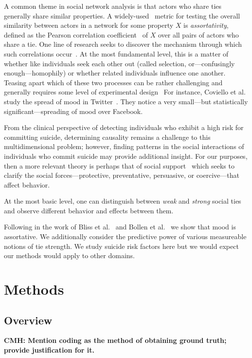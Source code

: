 \documentclass[11pt]{article}
\begin{document}
A common theme in social network analysis is that actors who share ties generally share similar properties. A widely-used~\cite{bliss2012twitter,coviello2014,bollen2011happiness} metric for testing the overall similarity between 
actors in a network for some property $X$ is \emph{assortativity}, defined as  the Pearson correlation coefficient~\cite{newman2002assortative} of $X$ over all pairs of actors who share a tie.  One line of research seeks
to discover the mechanism through which such correlations occur~\cite{newman2002assortative}. 
At the most fundamental level, this is a matter of whether like individuals seek each other out (called selection, or---confusingly enough---homophily) or whether related individuals influence one another. Teasing apart which of these two processes can be rather challenging and generally requires some level of experimental design~\cite{centola2010spread,centola2011experimental}
For instance, Coviello et al. study the spread of mood in Twitter~\cite{coviello2014}. They notice a very small---but statistically significant---spreading of mood over Facebook. 

From the clinical perspective of detecting individuals who exhibit a high risk for committing suicide, determining  causality remains a challenge to this multidimensional problem; however, finding patterns in the social interactions of individuals who commit suicide may provide additional insight. For our purposes, then a more relevant theory is perhaps that of social support~\cite{wellman1990different} which seeks to clarify the social forces---protective, preventative, persuasive, or coercive---that affect behavior. 

At the most basic level, one can distinguish between \emph{weak} and \emph{strong} social ties and observe different behavior and effects between them.  

Following in the work of Bliss et al.~\cite{coviello2014} and Bollen et al.~\cite{bollen2011happiness} we show that 
mood is assortative. We additionally consider the predictive power of various measureable notions of tie strength.
We study suicide risk factors here but we would expect our methods would apply to other domains.



\section{Methods}
\subsection{Overview}
\textbf{CMH: Mention coding as the method of obtaining ground truth; provide justification for it.}
\end{document}
